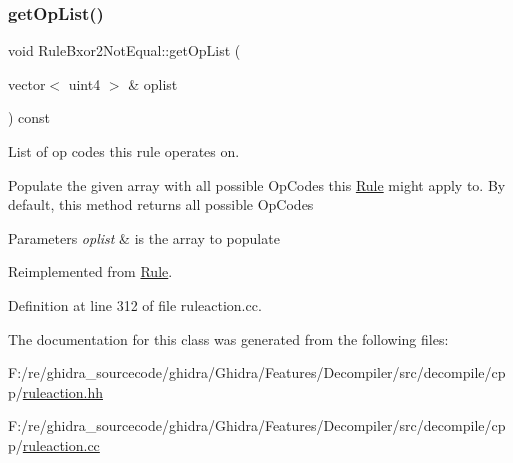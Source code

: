 \subsubsection{\texorpdfstring{getOpList()}{getOpList()}}
{\footnotesize\ttfamily void Rule\+Bxor2\+Not\+Equal\+::get\+Op\+List (\begin{DoxyParamCaption}\item[{vector$<$ uint4 $>$ \&}]{oplist }\end{DoxyParamCaption}) const\hspace{0.3cm}{\ttfamily [virtual]}}



List of op codes this rule operates on. 

Populate the given array with all possible Op\+Codes this \mbox{\hyperlink{class_rule}{Rule}} might apply to. By default, this method returns all possible Op\+Codes 
\begin{DoxyParams}{Parameters}
{\em oplist} & is the array to populate \\
\hline
\end{DoxyParams}


Reimplemented from \mbox{\hyperlink{class_rule_a4023bfc7825de0ab866790551856d10e}{Rule}}.



Definition at line 312 of file ruleaction.\+cc.



The documentation for this class was generated from the following files\+:\begin{DoxyCompactItemize}
\item 
F\+:/re/ghidra\+\_\+sourcecode/ghidra/\+Ghidra/\+Features/\+Decompiler/src/decompile/cpp/\mbox{\hyperlink{ruleaction_8hh}{ruleaction.\+hh}}\item 
F\+:/re/ghidra\+\_\+sourcecode/ghidra/\+Ghidra/\+Features/\+Decompiler/src/decompile/cpp/\mbox{\hyperlink{ruleaction_8cc}{ruleaction.\+cc}}\end{DoxyCompactItemize}
